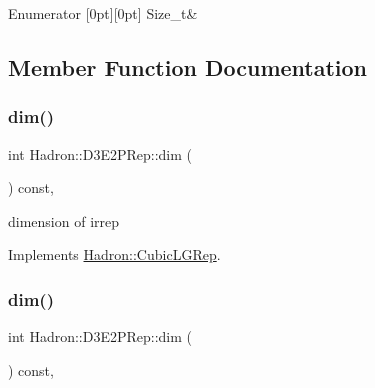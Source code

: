 \begin{DoxyEnumFields}{Enumerator}
[0pt][0pt]{}\mbox{\label{structHadron_1_1D3E2PRep_a7f89fe9c9a4099096d3f07ee9f1f0903a29f4e24303967a7e505e538b192362cf}} 
Size\+\_\+t&\\
\hline

\end{DoxyEnumFields}


\subsection{Member Function Documentation}
\mbox{\label{structHadron_1_1D3E2PRep_a8447155b89a2ca82aa11d902df9c3eb7}} 
\subsubsection{\texorpdfstring{dim()}{dim()}\hspace{0.1cm}{\footnotesize\ttfamily [1/3]}}
{\footnotesize\ttfamily int Hadron\+::\+D3\+E2\+P\+Rep\+::dim (\begin{DoxyParamCaption}{ }\end{DoxyParamCaption}) const\hspace{0.3cm}{\ttfamily [inline]}, {\ttfamily [virtual]}}

dimension of irrep 

Implements \mbox{\hyperlink{structHadron_1_1CubicLGRep_a3acbaea26503ed64f20df693a48e4cdd}{Hadron\+::\+Cubic\+L\+G\+Rep}}.

\mbox{\label{structHadron_1_1D3E2PRep_a8447155b89a2ca82aa11d902df9c3eb7}} 
\subsubsection{\texorpdfstring{dim()}{dim()}\hspace{0.1cm}{\footnotesize\ttfamily [2/3]}}
{\footnotesize\ttfamily int Hadron\+::\+D3\+E2\+P\+Rep\+::dim (\begin{DoxyParamCaption}{ }\end{DoxyParamCaption}) const\hspace{0.3cm}{\ttfamily [inline]}, {\ttfamily [virtual]}}

